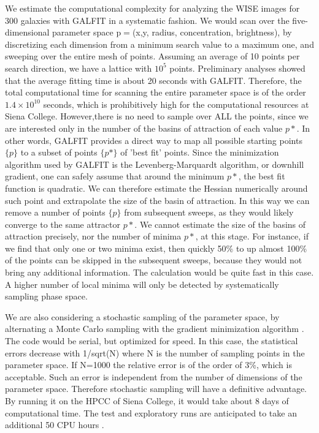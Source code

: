 \documentclass[12pt, preprint]{aastex}
\begin{document}
{We estimate the computational complexity for analyzing the WISE images
for 300 
galaxies with GALFIT in a systematic fashion. We would scan over the
five-dimensional parameter space  p$=$(x,y, radius, concentration,
brightness), by discretizing each dimension from a minimum search
value to a maximum one, and sweeping over the entire mesh of points.
Assuming an average of 10 points per search direction, we have a
lattice with $10^5$ points. Preliminary analyses showed that the average
fitting time is about 20 seconds with GALFIT. Therefore, the total
computational time  for scanning the entire parameter space is of the
order $1.4 \times 10^{10}$ seconds, which is  prohibitively high for the
computational resources at Siena College. However,there is no need to
sample over ALL the points, since we are interested only in the number
of the basins of attraction of each value $p*$. In other words, GALFIT
provides a direct way to map all possible starting points $\{p\}$ to a
subset of points $\{p*\}$ of 'best fit' points. Since the minimization
algorithm used by GALFIT is  the Levenberg-Marquardt algorithm, or
downhill gradient, one can safely assume that around the minimum $p*$,
the best fit function is quadratic. We can therefore estimate the
Hessian numerically around such point and extrapolate the size of the
basin of attraction. In this way we can remove a number of points $\{p\}$
from subsequent sweeps, as they would likely converge to the same attractor
$p*$. We cannot estimate the size of the basins of
attraction precisely, nor the number of minima $p*$, at this stage. For
instance, if we find that only one or two minima exist, then quickly
50\% to up almost 100\% of the points can be skipped in the subsequent
sweeps, because they would not bring any  additional information. The
calculation would be quite fast in this case.  A higher number of
local minima will only be detected by systematically sampling phase space.

We are also considering a stochastic sampling of the parameter space,
by alternating a Monte Carlo sampling with the gradient minimization
algorithm \citep{pardo11}. The code would be serial, but optimized for speed. In this
case, the statistical errors decrease with 1/sqrt(N) where N is the
number of sampling points in the parameter space. If N=1000 the
relative error is of the order of 3\%, which is acceptable. Such an error
is independent from the number of dimensions of the parameter space.
Therefore  stochastic sampling will have a definitive advantage.
By running it on the HPCC of Siena College, it would take about 8
days of computational time. The test and exploratory runs are
anticipated to take an additional 50 CPU hours \citep[for a recent
application of this method see,][]{sala12}.

}
\end{document}
